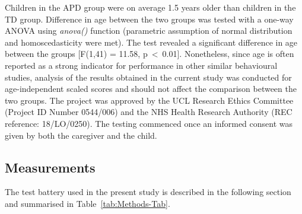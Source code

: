\documentclass[a4paper, twoside]{templates/ociamthesis}
\begin{document}
Children in the APD group were on average 1.5 years older than children in the TD group. Difference in age between the two groups was tested with a
one-way ANOVA using \emph{anova()} function (parametric assumption of normal distribution and homoscedasticity were met). The test revealed a significant
difference in age between the groups {[}F(1,41) = 11.58, p~\textless~0.01{]}. Nonetheless, since age is often reported as a strong indicator for performance in other similar behavioural studies, analysis of the results obtained in the current study was conducted for age-independent scaled scores and should not affect the comparison between the two groups. The project was approved by the UCL Research Ethics Committee (Project ID Number 0544/006) and the NHS Health Research Authority (REC reference: 18/LO/0250). The testing commenced once an informed consent was given by both the caregiver and the child.

\hypertarget{measurements}{%
\subsection{Measurements}\label{measurements}}

The test battery used in the present study is described in the following section and summarised in Table~\ref{tab:Methods-Tab}.
\end{document}
